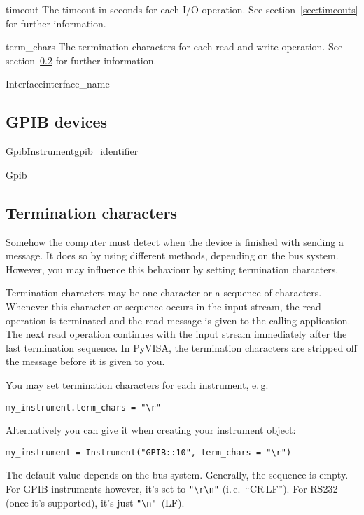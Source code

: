 \documentclass{howto}
\begin{document}
\begin{memberdesc}{timeout}
  The timeout in seconds for each I/O operation.  See
  section~\ref{sec:timeouts} for further information.
\end{memberdesc}

\begin{memberdesc}{term_chars}
  The termination characters for each read and write operation.  See
  section~\ref{sec:termchars} for further information.
\end{memberdesc}


\begin{classdesc}{Interface}{interface_name}
\end{classdesc}


\subsection{GPIB devices}

\begin{classdesc}{GpibInstrument}{gpib_identifier}
\end{classdesc}


\begin{classdesc}{Gpib}{}
\end{classdesc}


\subsection{Termination characters}
\label{sec:termchars}

Somehow the computer must detect when the device is finished with sending a
message.  It does so by using different methods, depending on the bus system.
However, you may influence this behaviour by setting termination characters.

Termination characters may be one character or a sequence of characters.
Whenever this character or sequence occurs in the input stream, the read
operation is terminated and the read message is given to the calling
application.  The next read operation continues with the input stream
immediately after the last termination sequence.  In PyVISA, the termination
characters are stripped off the message before it is given to you.

You may set termination characters for each instrument, e.\,g.
\begin{verbatim}
my_instrument.term_chars = "\r"
\end{verbatim}
Alternatively you can give it when creating your instrument object:
\begin{verbatim}
my_instrument = Instrument("GPIB::10", term_chars = "\r")
\end{verbatim}
The default value depends on the bus system.  Generally, the sequence is empty.
For GPIB instruments however, it's set to \verb|"\r\n"| (i.\,e.~``CR\,LF'')\@.
For RS232 (once it's supported), it's just \verb|"\n"|~(LF)\@.
\end{document}
